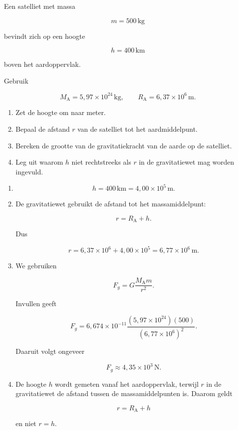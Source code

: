 \documentclass{ximera}
\begin{document}
\begin{oefening}{\oefB}

Een satelliet met massa

\[
m=500\,\mathrm{kg}
\]

bevindt zich op een hoogte

\[
h=400\,\mathrm{km}
\]

boven het aardoppervlak.

Gebruik

\[
M_\mathrm A=5{,}97\times10^{24}\,\mathrm{kg},
\qquad
R_\mathrm A=6{,}37\times10^6\,\mathrm m.
\]

\begin{enumerate}
  \item Zet de hoogte om naar meter.
  \item Bepaal de afstand $r$ van de satelliet tot het aardmiddelpunt.
  \item Bereken de grootte van de gravitatiekracht van de aarde op de
        satelliet.
  \item Leg uit waarom $h$ niet rechtstreeks als $r$ in de gravitatiewet
        mag worden ingevuld.
\end{enumerate}

\begin{oplossing}

\begin{enumerate}
  \item
  \[
  h=400\,\mathrm{km}=4{,}00\times10^5\,\mathrm m.
  \]

  \item De gravitatiewet gebruikt de afstand tot het massamiddelpunt:

  \[
  r=R_\mathrm A+h.
  \]

  Dus

  \[
  r
  =
  6{,}37\times10^6+4{,}00\times10^5
  =
  \boxed{6{,}77\times10^6\,\mathrm m}.
  \]

  \item We gebruiken

  \[
  F_g=G\frac{M_\mathrm A m}{r^2}.
  \]

  Invullen geeft

  \[
  F_g
  =
  6{,}674\times10^{-11}
  \frac{(5{,}97\times10^{24})(500)}
       {(6{,}77\times10^6)^2}.
  \]

  Daaruit volgt ongeveer

  \[
  \boxed{
  F_g\approx4{,}35\times10^3\,\mathrm N.
  }
  \]

  \item De hoogte $h$ wordt gemeten vanaf het aardoppervlak, terwijl
  $r$ in de gravitatiewet de afstand tussen de massamiddelpunten is.
  Daarom geldt

  \[
  \boxed{
  r=R_\mathrm A+h
  }
  \]

  en niet $r=h$.
\end{enumerate}

\end{oplossing}

\end{oefening}
\end{document}

